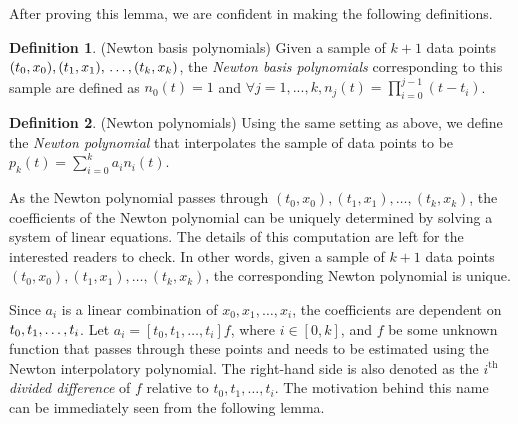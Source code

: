 \documentclass[a4paper,11pt,titlepage]{article}
\theoremstyle{definition}
\newtheorem{definition}{Definition}[section]
\theoremstyle{plain}
\theoremstyle{remark}
\begin{document}
After proving this lemma, we are confident in making the following definitions.

\begin{definition}
    (Newton basis polynomials) Given a sample of $k+1$ data points
$(t_0,x_0), (t_1,x_1), \\\dots, (t_k,x_k)$, the \textit{Newton basis polynomials} corresponding to this sample are defined as $n_0(t)=1$ and $\forall j=1,...,k, n_j(t)=\prod_{i=0}^{j-1}(t-t_i)$.
\end{definition}

\begin{definition}
    (Newton polynomials) Using the same setting as above, we define the \textit{Newton polynomial} that interpolates the sample of data points to be $p_k(t)=\sum_{i=0}^ka_in_i(t)$.
\end{definition}

As the Newton polynomial passes through $(t_0,x_0), (t_1,x_1), \dots, (t_k,x_k)$, the coefficients of the Newton polynomial can be uniquely determined by solving a system of linear equations. The details of this computation are left for the interested readers to check. In other words, given a sample of $k+1$ data points
$(t_0,x_0), (t_1,x_1), \dots, (t_k,x_k)$, the corresponding Newton polynomial is unique.

Since $a_i$ is a linear combination of $x_0,x_1,\dots,x_i$, the coefficients are dependent on $t_0,t_1,\dots,\\t_i$. Let $a_i=[t_0,t_1,\dots,t_i]f$, where $i\in[0,k]$, and $f$ be some unknown function that passes through these points and needs to be estimated using the Newton interpolatory polynomial. The right-hand side is also denoted as the $i^{\mathrm{th}}$ \textit{divided difference} of $f$ relative to $t_0,t_1,\dots,t_i$. The motivation behind this name can be immediately seen from the following lemma.
\end{document}
